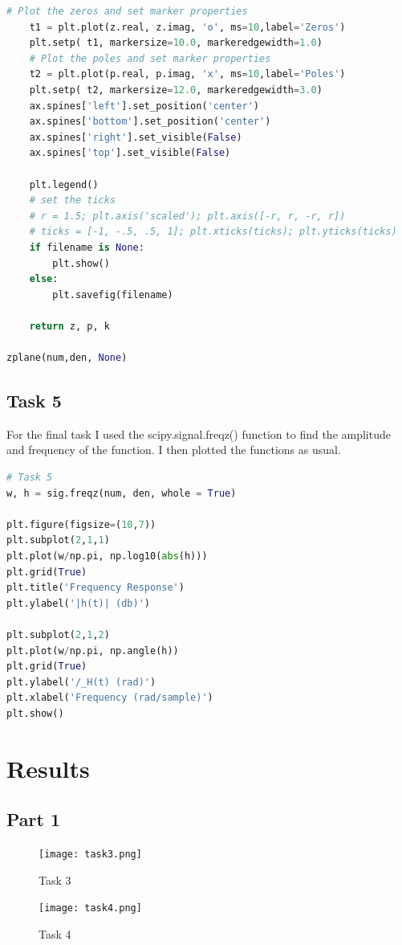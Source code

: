 \documentclass[12pt]{report}
\begin{document}
\begin{lstlisting}[language=Python]
    # Plot the zeros and set marker properties    
    t1 = plt.plot(z.real, z.imag, 'o', ms=10,label='Zeros')
    plt.setp( t1, markersize=10.0, markeredgewidth=1.0)
    # Plot the poles and set marker properties
    t2 = plt.plot(p.real, p.imag, 'x', ms=10,label='Poles')
    plt.setp( t2, markersize=12.0, markeredgewidth=3.0)
    ax.spines['left'].set_position('center')
    ax.spines['bottom'].set_position('center')
    ax.spines['right'].set_visible(False)
    ax.spines['top'].set_visible(False)
    
    plt.legend()
    # set the ticks
    # r = 1.5; plt.axis('scaled'); plt.axis([-r, r, -r, r])
    # ticks = [-1, -.5, .5, 1]; plt.xticks(ticks); plt.yticks(ticks)
    if filename is None:
        plt.show()
    else:
        plt.savefig(filename)
    
    return z, p, k

zplane(num,den, None)
\end{lstlisting}
\subsection{Task 5}
For the final task I used the scipy.signal.freqz() function to find the
amplitude and frequency of the function. I then plotted the functions as usual.
\begin{lstlisting}[language=Python]
# Task 5
w, h = sig.freqz(num, den, whole = True)

plt.figure(figsize=(10,7))
plt.subplot(2,1,1)
plt.plot(w/np.pi, np.log10(abs(h)))
plt.grid(True)
plt.title('Frequency Response')                           
plt.ylabel('|h(t)| (db)')

plt.subplot(2,1,2)
plt.plot(w/np.pi, np.angle(h))
plt.grid(True)
plt.ylabel('/_H(t) (rad)')
plt.xlabel('Frequency (rad/sample)')
plt.show()
\end{lstlisting}
\section{Results}
\subsection{Part 1}
\begin{figure}[H]
\begin{center}
\caption{Task 3}
\texttt{[image: task3.png]}
\end{center}
\end{figure}

\begin{figure}[H]
\begin{center}
\caption{Task 4}
\texttt{[image: task4.png]}
\end{center}
\end{figure}
\end{document}
